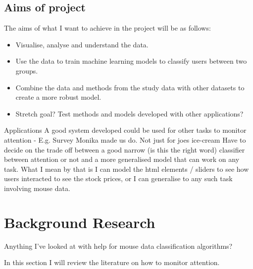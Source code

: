 \documentclass{article}
\begin{document}
\subsection{Aims of project}

The aims of what I want to achieve in the project will be as follows:
\begin{itemize}
    \item Visualise, analyse and understand the data.
    \item Use the data to train machine learning models to classify users between two groups.
    \item Combine the data and methods from the study data with other datasets to create a more robust model.
    \item Stretch goal? Test methods and models developed with other applications?
\end{itemize}






Applications
A good system developed could be used for other tasks to monitor attention - E.g. Survey Monika made us do. Not just for joes ice-cream
Have to decide on the trade off between a good narrow (is this the right word) classifier between attention or not and a more generalised model that can work on any task.
What I mean by that is I can model the html elements / sliders to see how users interacted to see the stock prices, or I can generalise to any such task involving mouse data.


\section{Background Research}
Anything I've looked at with help for mouse data classification algorithms? 

In this section I will review the literature on how to monitor attention.
\end{document}
